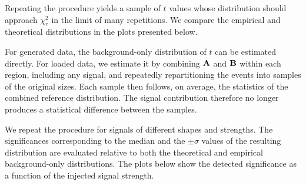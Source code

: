 \documentclass[paper/ddppaper2.tex]{subfiles}
\begin{document}
Repeating the procedure yields a sample of $t$ values whose distribution should approach $\chi^2_r$ in the limit of many repetitions. We compare the empirical and theoretical distributions in the plots presented below.

For generated data, the background-only distribution of $t$ can be estimated directly. For loaded data, we estimate it by combining ${\mathbf{A}}$ and ${\mathbf{B}}$ within each region, including any signal, and repeatedly repartitioning the events into samples of the original sizes. Each sample then follows, on average, the statistics of the combined reference distribution. The signal contribution therefore no longer produces a statistical difference between the samples.

We repeat the procedure for signals of different shapes and strengths. The significances corresponding to the median and the $\pm \sigma$ values of the resulting distribution are evaluated relative to both the theoretical and empirical background-only distributions. The plots below show the detected significance as a function of the injected signal strength.
\end{document}
